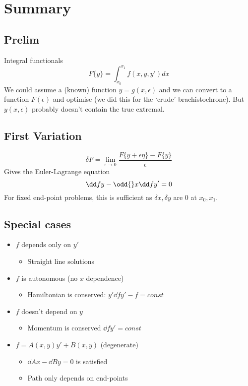 \documentclass{E:/Documents/Latex/myassignment}
\begin{document}
\section{Summary}
\subsection{Prelim}
Integral functionals
\[F\{y\} = \int_{x_0}^{x_1} f(x,y,y') dx\]
We could assume a (known) function $y = g(x,\epsilon)$ and we can convert to a function $F(\epsilon)$ and optimise (we did this for the `crude' brachistochrone). But $y(x,\epsilon)$ probably doesn't contain the true extremal.

\subsection{First Variation}
\[\delta F = \lim_{\epsilon \to 0} \frac{F\{y + \epsilon \eta\} - F\{y\}}{\epsilon}\]
Gives the Euler-Lagrange equation
\[\dd fy - \odd{}x \dd f{y'} = 0\]
For fixed end-point problems, this is sufficient as $\delta x, \delta y$ are $0$ at $x_0,x_1$.



\newpage
\subsection{Special cases}
\begin{itemize}
	\item $f$ depends only on $y'$
	\begin{itemize}
		\item Straight line solutions
	\end{itemize}
	\item $f$ is autonomous (no $x$ dependence)
	\begin{itemize}
		\item Hamiltonian is conserved: $y' \dd f{y'} - f = const$
	\end{itemize}
	\item $f$ doesn't depend on $y$
	\begin{itemize}
		\item Momentum is conserved $\dd f{y'} = const$
	\end{itemize}
	\item $f = A(x,y)y' + B(x,y)$ (degenerate)
	\begin{itemize}
		\item $\dd Ax - \dd By = 0$ is satisfied
		\item Path only depends on end-points
	\end{itemize}
\end{itemize}
\end{document}
